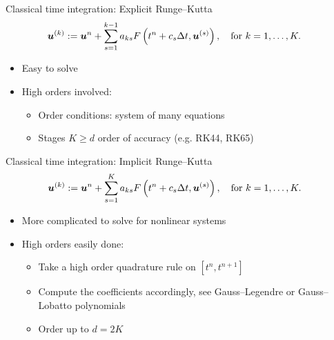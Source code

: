 \documentclass[9pt,compress,t,aspectratio=169]{beamer}
\begin{document}
\begin{frame}{Classical time integration: Explicit Runge--Kutta}
\begin{align*}
	&\boldsymbol{u}^{(k)}:=\boldsymbol{u}^n+\sum_{s=1}^{k-1} a_{ks} F\left(t^n+c_s\Delta t,\boldsymbol{u}^{(s)}\right),\quad \text{for } k=1,\dots, K.
\end{align*}

\begin{itemize}
\item Easy to solve
\item High orders involved:
\begin{itemize}
\item Order conditions: system of many equations
\item Stages  $K\geq d$ order of accuracy (e.g. RK44, RK65) 
\end{itemize}
\end{itemize} 
 
\end{frame}

\begin{frame}{Classical time integration: Implicit Runge--Kutta}
\begin{align*}
	&\boldsymbol{u}^{(k)}:=\boldsymbol{u}^n+\sum_{s=1}^{K} a_{ks} F\left(t^n+c_s\Delta t,\boldsymbol{u}^{(s)}\right), \quad \text{for } k=1,\dots, K.
\end{align*}

\begin{itemize}
\item More complicated to solve for nonlinear systems
\item High orders easily done:
\begin{itemize}
\item Take a high order quadrature rule on $[t^n,t^{n+1}]$
\item Compute the coefficients accordingly, see Gauss--Legendre or Gauss--Lobatto polynomials
\item Order up to $d=2K$ 
\end{itemize}
\end{itemize} 
 
\end{frame}
\end{document}
